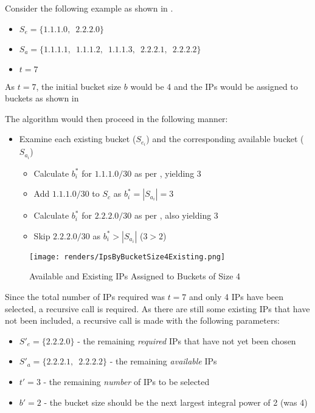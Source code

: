 Consider the following example as shown in .
\begin{itemize}
\item{$S_e = \{1.1.1.0,\enspace2.2.2.0\}$}
\item{$S_a = \{1.1.1.1,\enspace1.1.1.2,\enspace1.1.1.3,\enspace2.2.2.1,\enspace2.2.2.2\}$}
\item{$t = 7$}
\end{itemize}

As $t = 7$, the initial bucket size $b$ would be 4 and the IPs would be assigned to buckets as shown in 

The algorithm would then proceed in the following manner:
\begin{itemize}
\item{Examine each existing bucket ($S_{e_i}$) and the corresponding available bucket ($S_{a_i}$)}
\begin{itemize}
\item{Calculate $b_i^*$ for $1.1.1.0/30$ as per , yielding 3}
\item{Add $1.1.1.0/30$ to $S_c$ as $b^*_i = |S_{a_i}| = 3$}
\end{itemize}
\begin{itemize}
\item{Calculate $b_i^*$ for $2.2.2.0/30$ as per , also yielding 3}
\item{Skip $2.2.2.0/30$ as $b^*_i > |S_{a_i}|$ ($3 > 2$)}   
\end{itemize}
\end{itemize}

\begin{figure}[H]
      \centering
      \texttt{[image: renders/IpsByBucketSize4Existing.png]}
      \caption{Available and Existing IPs Assigned to Buckets of Size 4}
      \label{fig:ipsByBucketExisting4}
\end{figure}

Since the total number of IPs required was $t = 7$ and only 4 IPs have been selected, a recursive call is required. As there are still some existing IPs that have not been included, a recursive call is made with the following parameters:
\begin{itemize}
\item{$S'_e = \{2.2.2.0\}$ - the remaining \textit{required} IPs that have not yet been chosen}
\item{$S'_a = \{2.2.2.1,\enspace2.2.2.2\}$ - the remaining \textit{available} IPs}
\item{$t' = 3$ - the remaining \textit{number} of IPs to be selected}
\item{$b' = 2$ - the bucket size should be the next largest integral power of 2 (was 4)}
\end{itemize}

